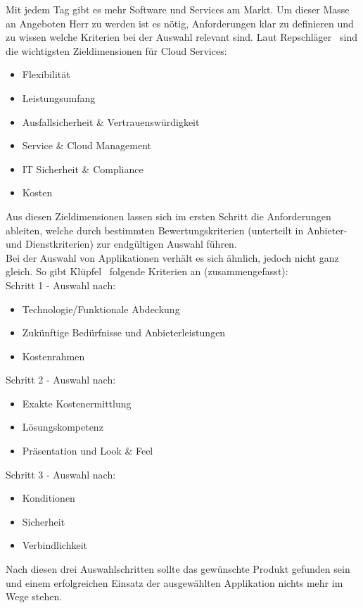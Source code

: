 Mit jedem Tag gibt es mehr Software und Services am Markt. Um dieser Masse an Angeboten Herr zu werden ist es n\"otig, Anforderungen klar zu definieren und zu wissen welche Kriterien bei der Auswahl relevant sind. Laut Repschl\"ager~\cite{Repschl2013} sind die wichtigsten Zieldimensionen f\"ur Cloud Services:
\begin{itemize}
\item Flexibilit\"at
\item Leistungsumfang
\item Ausfallsicherheit \& Vertrauenswürdigkeit
\item Service \& Cloud Management
\item IT Sicherheit \& Compliance
\item Kosten
\end{itemize}
Aus diesen Zieldimensionen lassen sich im ersten Schritt die Anforderungen ableiten, welche durch bestimmten Bewertungskriterien (unterteilt in  Anbieter- und Dienstkriterien) zur endg\"ultigen Auswahl f\"uhren.\\

Bei der Auswahl von Applikationen verh\"alt es sich \"ahnlich, jedoch nicht ganz gleich. So gibt Kl\"upfel~\cite{Klupfel2007} folgende Kriterien an (zusammengefasst):\\
Schritt 1 - Auswahl nach:
\begin{itemize}
\item Technologie/Funktionale Abdeckung
\item Zuk\"unftige Bed\"urfnisse und Anbieterleistungen
\item Kostenrahmen
\end{itemize}
Schritt 2 - Auswahl nach:
\begin{itemize}
\item Exakte Kostenermittlung
\item L\"osungskompetenz
\item Pr\"asentation und Look \& Feel
\end{itemize}
Schritt 3 - Auswahl nach:
\begin{itemize}
\item Konditionen
\item Sicherheit
\item Verbindlichkeit
\end{itemize}
Nach diesen drei Auswahlschritten sollte das gew\"unschte Produkt gefunden sein und einem erfolgreichen Einsatz der ausgew\"ahlten Applikation nichts mehr im Wege stehen.